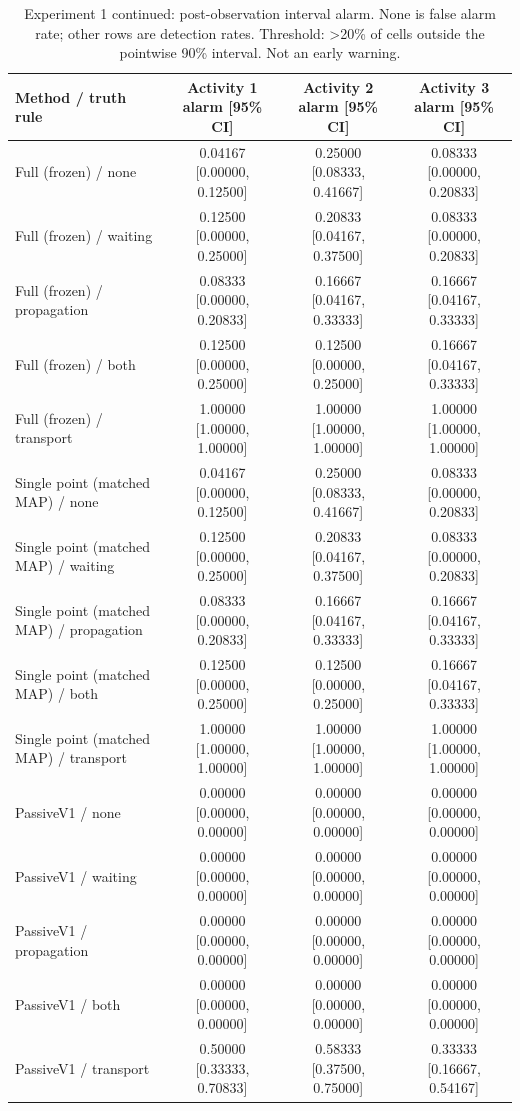 \documentclass[10pt]{article}
\begin{document}
\begin{table}[t]
\centering
\small
\caption{Experiment 1 continued: post-observation interval alarm. None is false alarm rate; other rows are detection rates. Threshold: >20\% of cells outside the pointwise 90\% interval. Not an early warning.}
\begin{tabular}{lccc}
\toprule
Method / truth rule & Activity 1 alarm [95\% CI] & Activity 2 alarm [95\% CI] & Activity 3 alarm [95\% CI] \\
\midrule
Full (frozen) / none & 0.04167 [0.00000, 0.12500] & 0.25000 [0.08333, 0.41667] & 0.08333 [0.00000, 0.20833] \\
Full (frozen) / waiting & 0.12500 [0.00000, 0.25000] & 0.20833 [0.04167, 0.37500] & 0.08333 [0.00000, 0.20833] \\
Full (frozen) / propagation & 0.08333 [0.00000, 0.20833] & 0.16667 [0.04167, 0.33333] & 0.16667 [0.04167, 0.33333] \\
Full (frozen) / both & 0.12500 [0.00000, 0.25000] & 0.12500 [0.00000, 0.25000] & 0.16667 [0.04167, 0.33333] \\
Full (frozen) / transport & 1.00000 [1.00000, 1.00000] & 1.00000 [1.00000, 1.00000] & 1.00000 [1.00000, 1.00000] \\
Single point (matched MAP) / none & 0.04167 [0.00000, 0.12500] & 0.25000 [0.08333, 0.41667] & 0.08333 [0.00000, 0.20833] \\
Single point (matched MAP) / waiting & 0.12500 [0.00000, 0.25000] & 0.20833 [0.04167, 0.37500] & 0.08333 [0.00000, 0.20833] \\
Single point (matched MAP) / propagation & 0.08333 [0.00000, 0.20833] & 0.16667 [0.04167, 0.33333] & 0.16667 [0.04167, 0.33333] \\
Single point (matched MAP) / both & 0.12500 [0.00000, 0.25000] & 0.12500 [0.00000, 0.25000] & 0.16667 [0.04167, 0.33333] \\
Single point (matched MAP) / transport & 1.00000 [1.00000, 1.00000] & 1.00000 [1.00000, 1.00000] & 1.00000 [1.00000, 1.00000] \\
PassiveV1 / none & 0.00000 [0.00000, 0.00000] & 0.00000 [0.00000, 0.00000] & 0.00000 [0.00000, 0.00000] \\
PassiveV1 / waiting & 0.00000 [0.00000, 0.00000] & 0.00000 [0.00000, 0.00000] & 0.00000 [0.00000, 0.00000] \\
PassiveV1 / propagation & 0.00000 [0.00000, 0.00000] & 0.00000 [0.00000, 0.00000] & 0.00000 [0.00000, 0.00000] \\
PassiveV1 / both & 0.00000 [0.00000, 0.00000] & 0.00000 [0.00000, 0.00000] & 0.00000 [0.00000, 0.00000] \\
PassiveV1 / transport & 0.50000 [0.33333, 0.70833] & 0.58333 [0.37500, 0.75000] & 0.33333 [0.16667, 0.54167] \\
\bottomrule
\end{tabular}
\end{table}
\end{document}
